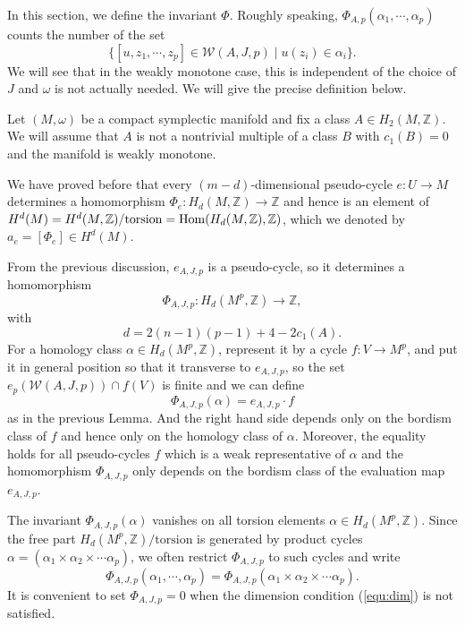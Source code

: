 \documentclass[twoside]{article}
\begin{document}
In this section, we define the invariant $\Phi$. Roughly speaking, 
$\Phi_{A,p}(\alpha_1,\cdots,\alpha_p)$ counts the number of the set
\[\{[u,z_1,\cdots,z_p]\in\mathscr{W}(A,J,p)\mid u(z_i)\in \alpha_i    \}.\]
We will see that in the weakly monotone case, 
this is independent of the choice of $J$ and $\omega$ is not actually needed. 
We will give the precise definition below.

Let $(M,\omega)$ be a compact symplectic manifold and fix a class $A\in H_2(M,\mathbb{Z})$. 
We will assume that $A$ is not a nontrivial multiple 
of a class $B$ with $c_1(B)=0$ and the manifold is weakly monotone.

We have proved before that every $(m-d)$-dimensional pseudo-cycle $e\colon U\rightarrow M$ 
determines a homomorphism $\Phi_e\colon H_d(M,\mathbb{Z})\rightarrow \mathbb{Z}$ and hence 
is an element of $H^d(M)=H^d(M,\mathbb{Z})/\mathrm{torsion}=\operatorname{Hom}(H_d(M,\mathbb{Z}),\mathbb{Z})$, 
which we denoted by $a_e=[\Phi_e]\in H^d(M)$.

From the previous discussion, $e_{A,J,p}$ is a pseudo-cycle, so it determines a homomorphism
\[\Phi_{A,J,p}\colon H_d(M^p,\mathbb{Z})\rightarrow \mathbb{Z},\]
with 
\begin{equation}\label{equ:dim}
    d=2(n-1)(p-1)+4-2c_1(A).
\end{equation}
For a homology class $\alpha\in H_d(M^p,\mathbb{Z})$, represent it by a cycle $f\colon V\rightarrow M^p$, 
and put it in general position so that it transverse to $e_{A,J,p}$, 
so the set $e_p(\mathscr{W}(A,J,p))\cap f(V)$ is finite and we can define
\[\Phi_{A,J,p}(\alpha)=e_{A,J,p}\cdot f\]
as in the previous Lemma. 
And the right hand side depends only on the bordism class of $f$ and hence only on the homology class of $\alpha$. 
Moreover, the equality holds for all pseudo-cycles $f$ 
which is a weak representative of $\alpha$ and the homomorphism $\Phi_{A,J,p}$ 
only depends on the bordism class of the evaluation map $e_{A,J,p}$.

The invariant $\Phi_{A,J,p}(\alpha)$ vanishes on all torsion elements $\alpha\in H_d(M^p,\mathbb{Z})$. 
Since the free part $H_d(M^p,\mathbb{Z})/\mathrm{torsion}$ is generated by 
product cycles $\alpha=(\alpha_1\times\alpha_2\times\cdots \alpha_p)$, 
we often restrict $\Phi_{A,J,p}$ to such cycles and write
\[\Phi_{A,J,p}(\alpha_1,\cdots,\alpha_p)=\Phi_{A,J,p}(\alpha_1\times\alpha_2\times\cdots \alpha_p).\]
It is convenient to set $\Phi_{A,J,p}=0$ when the dimension condition (\ref{equ:dim}) is not satisfied.
\end{document}
